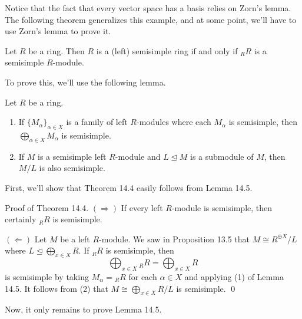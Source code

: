 Notice that the fact that every vector space has a basis relies on Zorn's lemma. 
The following theorem generalizes this example, and at some point, we'll have to use 
Zorn's lemma to prove it. 

\begin{theo}{}
    Let $R$ be a ring. Then $R$ is a (left) semisimple ring if and only if 
    ${}_R R$ is a semisimple $R$-module. 
\end{theo}

To prove this, we'll use the following lemma. 

\begin{lemma}{}
    Let $R$ be a ring. 
    \begin{enumerate}[(1)]
        \item If $\{M_\alpha\}_{\alpha \in X}$ is a family of left $R$-modules 
        where each $M_\alpha$ is semisimple, then $\bigoplus_{\alpha \in X} 
        M_\alpha$ is semisimple. 
        \item If $M$ is a semisimple left $R$-module and $L \trianglelefteq M$ 
        is a submodule of $M$, then $M/L$ is also semisimple. 
    \end{enumerate}
\end{lemma}

First, we'll show that Theorem 14.4 easily follows from Lemma 14.5. 

{\sc Proof of Theorem 14.4.} $(\Rightarrow)$ If every left $R$-module is semisimple, 
then certainly ${}_R R$ is semisimple. 

$(\Leftarrow)$ Let $M$ be a left $R$-module. We saw in Proposition 13.5 that 
$M \cong R^{\oplus X}/L$ where $L \trianglelefteq \bigoplus_{x \in X} R$. 
If ${}_R R$ is semisimple, then 
\[ \bigoplus_{x \in X} {}_R R = \bigoplus_{x \in X} R \] 
is semisimple by taking $M_\alpha = {}_R R$ for each $\alpha \in X$ and 
applying (1) of Lemma 14.5. It follows from (2) that $M \cong 
\bigoplus_{x \in X} R/L$ is semisimple. \qed 

Now, it only remains to prove Lemma 14.5. 

